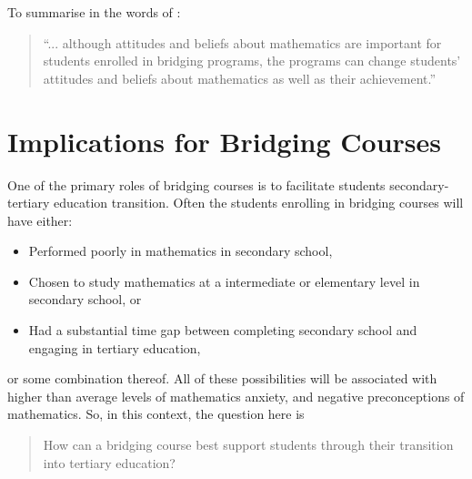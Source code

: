 \documentclass[twoside,12pt,a4paper]{report}
\begin{document}
To summarise in the words of :
\begin{quote}
``... although attitudes and beliefs about mathematics are important for students
enrolled in bridging programs, the programs can change students' attitudes and
beliefs about mathematics as well as their achievement.''
\end{quote}












\section{Implications for Bridging Courses}
\label{sec:literatureRecommendations}

One of the primary roles of bridging courses is to facilitate students secondary-tertiary education transition. Often the students enrolling in bridging courses will have either:\begin{itemize}
	\item Performed poorly in mathematics in secondary school, 
	\item Chosen to study mathematics at a intermediate or elementary level in secondary school, or
	\item Had a substantial time gap between completing secondary school and engaging in tertiary education,
\end{itemize}
or some combination thereof. All of these possibilities will be associated with higher than average levels of mathematics anxiety, and negative preconceptions of mathematics. So, in this context, the question here is

\begin{quote}
How can a bridging course best support students through their transition into tertiary education?
\end{quote}
\end{document}
